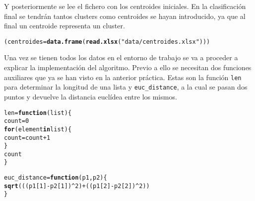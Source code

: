 \documentclass[12pt]{report}\usepackage[]{graphicx}\usepackage[dvipsnames]{xcolor}
\makeatletter
\newcommand{\hlnum}[1]{\textcolor[rgb]{0.686,0.059,0.569}{#1}}%
\newcommand{\hlstr}[1]{\textcolor[rgb]{0.192,0.494,0.8}{#1}}%
\newcommand{\hlopt}[1]{\textcolor[rgb]{0,0,0}{#1}}%
\newcommand{\hlstd}[1]{\textcolor[rgb]{0.345,0.345,0.345}{#1}}%
\newcommand{\hlkwa}[1]{\textcolor[rgb]{0.161,0.373,0.58}{\textbf{#1}}}%
\newcommand{\hlkwb}[1]{\textcolor[rgb]{0.69,0.353,0.396}{#1}}%
\newcommand{\hlkwc}[1]{\textcolor[rgb]{0.333,0.667,0.333}{#1}}%
\newcommand{\hlkwd}[1]{\textcolor[rgb]{0.737,0.353,0.396}{\textbf{#1}}}%
\newenvironment{kframe}{%
 \def\at@end@of@kframe{}%
 \ifinner\ifhmode%
  \def\at@end@of@kframe{\end{minipage}}%
  \begin{minipage}{\columnwidth}%
 \fi\fi%
 \def\FrameCommand##1{\hskip\@totalleftmargin \hskip-\fboxsep
 \colorbox{shadecolor}{##1}\hskip-\fboxsep
     \hskip-\linewidth \hskip-\@totalleftmargin \hskip\columnwidth}%
 \MakeFramed {\advance\hsize-\width
   \@totalleftmargin\z@ \linewidth\hsize
   \@setminipage}}%
 {\par\unskip\endMakeFramed%
 \at@end@of@kframe}
\newenvironment{knitrout}{}{} %
\makeatother
\begin{document}
	 Y posteriormente se lee el fichero con los centroides iniciales. En la clasificación final se tendrán tantos clusters como centroides se hayan introducido, ya que al final un centroide representa un cluster.
	 
\begin{knitrout}
\color{fgcolor}\begin{kframe}
\begin{alltt}
\hlstd{(centroides} \hlkwb{=} \hlkwd{data.frame}\hlstd{(}\hlkwd{read.xlsx}\hlstd{(}\hlstr{"data/centroides.xlsx"}\hlstd{)))}
\end{alltt}


{\ttfamily\noindent\bfseries{}}\end{kframe}
\end{knitrout}
	 
	 Una vez se tienen todos los datos en el entorno de trabajo se va a proceder a explicar la implementación del algoritmo. Previo a ello se necesitan dos funciones auxiliares que ya se han visto en la anterior práctica. Estas son la función \texttt{len} para determinar la longitud de una lista y \texttt{euc\_distance}, a la cual se pasan dos puntos y devuelve la distancia euclídea entre los mismos.
	 
\begin{knitrout}
\color{fgcolor}\begin{kframe}
\begin{alltt}
\hlstd{len} \hlkwb{=} \hlkwa{function}\hlstd{(}\hlkwc{list}\hlstd{) \{}
                 \hlstd{count} \hlkwb{=} \hlnum{0}
                 \hlkwa{for} \hlstd{(element} \hlkwa{in} \hlstd{list) \{}
                        \hlstd{count} \hlkwb{=} \hlstd{count} \hlopt{+} \hlnum{1}
                 \hlstd{\}}
                 \hlstd{count}
\hlstd{\}}

\hlstd{euc_distance} \hlkwb{=} \hlkwa{function}\hlstd{(}\hlkwc{p1}\hlstd{,} \hlkwc{p2}\hlstd{) \{}
        \hlkwd{sqrt}\hlstd{(((p1[}\hlnum{1}\hlstd{]} \hlopt{-} \hlstd{p2[}\hlnum{1}\hlstd{])}\hlopt{^}\hlnum{2}\hlstd{)} \hlopt{+} \hlstd{((p1[}\hlnum{2}\hlstd{]} \hlopt{-} \hlstd{p2[}\hlnum{2}\hlstd{])}\hlopt{^}\hlnum{2}\hlstd{))}
\hlstd{\}}
\end{alltt}
\end{kframe}
\end{knitrout}
	 
\end{document}

